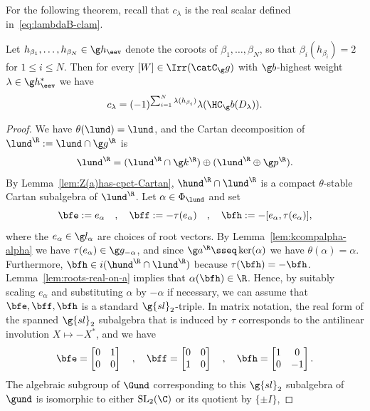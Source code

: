 \documentclass[12pt]{amsart}
\begin{document}
For the following theorem, recall that $c_\lambda$ is the real scalar defined in~\eqref{eq:lambdaB-clam}.
\begin{thm}
\label{thm:alternateclam}
Let $h_{\beta_1},\ldots,h_{\beta_N}\in\g h_\eev$ denote the coroots of $\beta_1,\ldots,\beta_N$, so that $\beta_i(h_{\beta_i})=2$ for $1\leq i\leq N$. Then for every $[W]\in\Irr(\catC_\g g)$  with $\g b$-highest weight $\lambda\in\g h_\eev^*$ we have 
 \[
 c_\lambda=(-1)^{\sum_{i=1}^N\lambda(h_{\beta_i})}\lambda(\HC_\g b(D_\lambda)).
 \]
\end{thm}
\begin{proof}
We have $\theta(\lund)=\lund$, and the Cartan decomposition of 
$\lund^\R:=\lund\cap\g g^\R$
 is 
\[
\lund^\R=(\lund^\R\cap\g k^\R)\oplus(\lund^\R\oplus \g p^\R)
.\] By Lemma~\ref{lem:Z(a)has-cpct-Cartan},  $\hund^\R\cap\lund^\R$ is a 
compact $\theta$-stable Cartan subalgebra of $\lund^\R$.  Let $\alpha\in\Phi_{\lund}$ and set
\[
\bfe:=e_\alpha\quad,\quad
\bff:=-\tau(e_\alpha)\quad,\quad
\bfh:=-[e_\alpha,\tau(e_\alpha)],
\] 
where the $e_\alpha\in\g l_\alpha$ are choices of root vectors. 
By Lemma~\ref{lem:kcompalpha-alpha} we have  $\tau(e_\alpha)\in\g g_{-\alpha}$, and since $\g a^\R\sseq \ker(\alpha)$ we have $\theta(\alpha)=\alpha$. Furthermore,  
 $\bfh\in i(\hund^\R\cap \lund^\R)$
because $\tau(\bfh)=-\bfh$. 
Lemma~\ref{lem:roots-real-on-a} implies that $\alpha(\bfh)\in\R$. Hence, by suitably scaling $e_\alpha$ and substituting $\alpha$ by $-\alpha$ if necessary, we can assume that $\bfe,\bff,\bfh$ is a  standard $\g{sl}_2$-triple. In matrix notation, the real form of the spanned $\g{sl}_2$ subalgebra that is induced by $\tau$ corresponds to the antilinear involution $X\mapsto -X^*$, and we have 
\[
\bfe=\begin{bmatrix}
0 & 1\\
0 & 0
\end{bmatrix}\quad,\quad
\bff=\begin{bmatrix}
0 & 0\\1 & 0
\end{bmatrix}\quad,\quad
\bfh=\begin{bmatrix}
1 & 0\\0 & -1
\end{bmatrix}.
\]
The algebraic subgroup of $\Gund$ corresponding to this $\g{sl}_2$ subalgebra of $\gund$ is isomorphic to either  $\mathrm{SL}_2(\C)$ or its quotient by $\{\pm I\}$, 

\end{proof}
\end{document}
